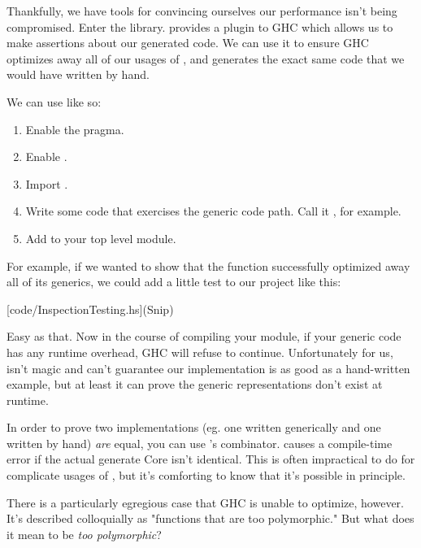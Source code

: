 \documentclass[book.tex]{subfiles}
\begin{document}
Thankfully, we have tools for convincing ourselves our performance isn't being
compromised. Enter the \cite{inspection-testing}
library.  provides a plugin to GHC which allows us to
make assertions about our generated code. We can use it to ensure GHC optimizes
away all of our usages of , and generates the exact same code
that we would have written by hand.

We can use  like so:


\begin{enumerate}
  \item{Enable the  pragma.}
  \item{Enable .}
  \item{Import .}
  \item{Write some code that exercises the generic code path. Call it ,
    for example.}
  \item{Add  to your top level module.}
\end{enumerate}

For example, if we wanted to show that the  function successfully
optimized away all of its generics, we could add a little test to our project
like this:

[code/InspectionTesting.hs](Snip)

Easy as that. Now in the course of compiling your module, if your generic code
has any runtime overhead, GHC will refuse to continue. Unfortunately for us,
 isn't magic and can't guarantee our implementation is
as good as a hand-written example, but at least it can prove the generic
representations don't exist at runtime.

In order to prove two implementations (eg. one written generically and one
written by hand) \emph{are} equal, you can use 's
\hs{(===)} combinator. \hs{(===)} causes a compile-time error if the actual
generate Core isn't identical. This is often impractical to do for complicate
usages of , but it's comforting to know that it's possible in
principle.

There is a particularly egregious case that GHC is unable to optimize, however.
It's described colloquially as "functions that are too polymorphic." But what
does it mean to be \emph{too polymorphic}?
\end{document}
